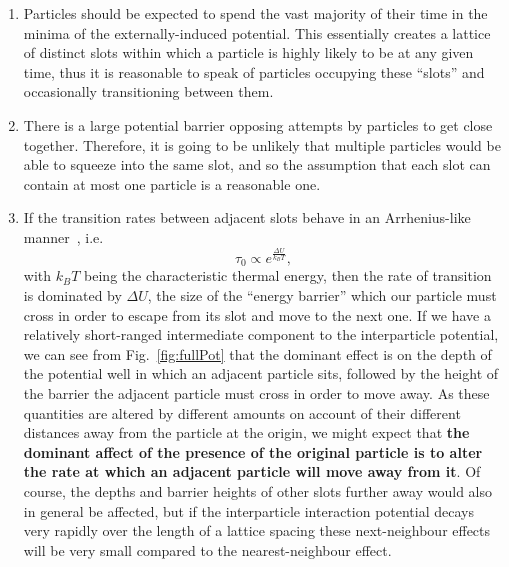 \begin{enumerate}
\item Particles should be expected to spend the vast majority of their time in the minima of the 
externally-induced potential. This essentially creates a lattice of distinct slots within which a
particle
is highly likely to be at any given time, thus it is reasonable to speak of particles occupying these 
``slots'' and occasionally transitioning between them.
 \item There is a large potential barrier opposing attempts by particles to get close together. Therefore,
 it is going to be unlikely that multiple particles would be able to squeeze into the same slot,
 and so the assumption that each slot can contain at most one particle is a reasonable one.
 \item If the transition rates between adjacent slots behave in an Arrhenius-like manner~\cite{arrhenius1889, levine2005}, i.e.
 \begin{equation}
  \tau_0 \propto e^{\frac{\Delta U}{k_B T}},
 \end{equation}
 with $k_B T$ being the characteristic thermal energy,
then the rate of transition is dominated by $\Delta U$, the size of the ``energy barrier'' which
our particle must cross in order to escape from its slot and move to the next one. If we have a relatively
short-ranged intermediate component to the interparticle potential, we can see from Fig.~\ref{fig:fullPot}
that the dominant effect is on the depth of the potential well in which an adjacent particle sits, followed
by the height of the barrier the adjacent particle must cross in order to move away. As these
quantities are altered by different amounts on account of their different distances away from the particle
at the origin, we might expect that \textbf{the dominant affect of the presence of the original particle is
to alter the rate at which an adjacent particle will move away from it}. Of course, the depths and barrier
heights of other slots further away would also in general be affected, but if the interparticle interaction potential decays very rapidly over the length of a lattice spacing these next-neighbour effects will be
very small compared to the nearest-neighbour effect.
\end{enumerate}

